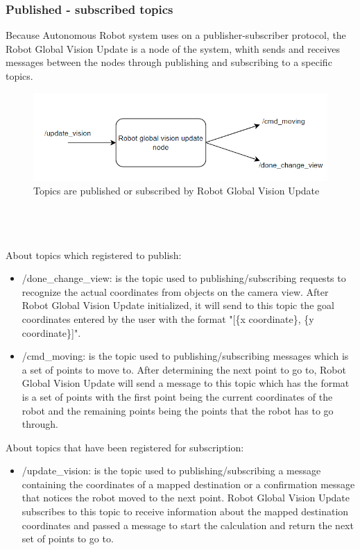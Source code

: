 \documentclass[13pt,a4paper]{article}
\begin{document}
		\subsubsection{Published - subscribed topics}
		Because Autonomous Robot system uses on a publisher-subscriber protocol, the Robot Global Vision Update is a node of the system, whith sends and receives messages between the nodes through publishing and subscribing to a specific topics.
		\begin{figure}[!h]
			\centering
			\includegraphics[width=1\textwidth]{Robot_Global_Vision_Update/RGVU_node_pub_sub.png}
			\caption{Topics are published or subscribed by Robot Global Vision Update}
		\end{figure} \\ \\ \\
		About topics which registered to publish:
		\begin{itemize}
			\item /done\_change\_view: is the topic used to publishing/subscribing requests to recognize the actual coordinates from objects on the camera view. After Robot Global Vision Update initialized, it will send to this topic the goal coordinates entered by the user with the format "[\{x coordinate\}, \{y coordinate\}]".
			\item /cmd\_moving: is the topic used to publishing/subscribing messages which is a set of points to move to. After determining the next point to go to, Robot Global Vision Update will send a message to this topic which has the format is a set of points with the first point being the current coordinates of the robot and the remaining points being the points that the robot has to go through.
		\end{itemize}
		About topics that have been registered for subscription:
		\begin{itemize}
			\item /update\_vision: is the topic used to publishing/subscribing a message containing the coordinates of a mapped destination or a confirmation message that notices the robot moved to the next point. Robot Global Vision Update subscribes to this topic to receive information about the mapped destination coordinates and passed a message to start the calculation and return the next set of points to go to.
		\end{itemize}
		
\end{document}
